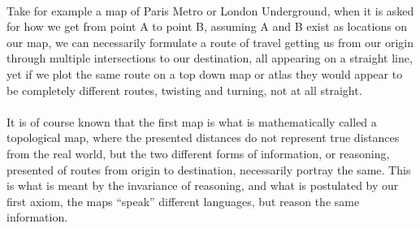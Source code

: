 \paragraph{}Take for example a map of Paris Metro or London Underground, when it is asked for how we get from point A to point B, assuming A and B exist as locations on our map, we can necessarily formulate a route of travel getting us from our origin through multiple intersections to our destination, all appearing on a straight line, yet if we plot the same route on a top down map or atlas they would appear to be completely different routes, twisting and turning, not at all straight.

\paragraph{}It is of course known that the first map is what is mathematically called a topological map, where the presented distances do not represent true distances from the real world, but the two different forms of information, or reasoning, presented of routes from origin to destination, necessarily portray the same. This is what is meant by the invariance of reasoning, and what is postulated by our first axiom, the maps ``speak'' different languages, but reason the same information.
